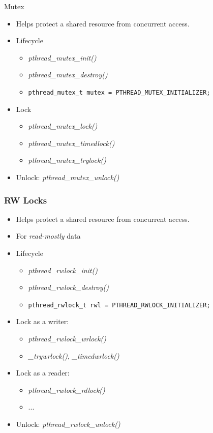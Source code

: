 \begin{frame}[fragile]{Mutex}

  \begin{itemize}
  \item Helps protect a shared resource from concurrent access.
  \item Lifecycle
    \begin{itemize}
    \item \emph{pthread\_mutex\_init()}
    \item \emph{pthread\_mutex\_destroy()}
    \item \verb+pthread_mutex_t mutex = PTHREAD_MUTEX_INITIALIZER;+
    \end{itemize}
  \item Lock
    \begin{itemize}
    \item \emph{pthread\_mutex\_lock()}
    \item \emph{pthread\_mutex\_timedlock()}
    \item \emph{pthread\_mutex\_trylock()}
    \end{itemize}
  \item Unlock: \emph{pthread\_mutex\_unlock()}
  \end{itemize}
\end{frame}


\begin{frame}[fragile]
  \frametitle{RW Locks}

  \begin{itemize}
  \item Helps protect a shared resource from concurrent access.
  \item For \emph{read-mostly} data
  \item Lifecycle
    \begin{itemize}
    \item \emph{pthread\_rwlock\_init()}
    \item \emph{pthread\_rwlock\_destroy()}
    \item \verb+pthread_rwlock_t rwl = PTHREAD_RWLOCK_INITIALIZER;+
    \end{itemize}
  \item Lock as a writer:
    \begin{itemize}
    \item \emph{pthread\_rwlock\_wrlock()}
    \item \emph{\_trywrlock()},  \emph{\_timedwrlock()}
    \end{itemize}
  \item Lock as a reader:
    \begin{itemize}
    \item \emph{pthread\_rwlock\_rdlock()}
    \item ...
    \end{itemize}
  \item Unlock: \emph{pthread\_rwlock\_unlock()}
  \end{itemize}
\end{frame}


